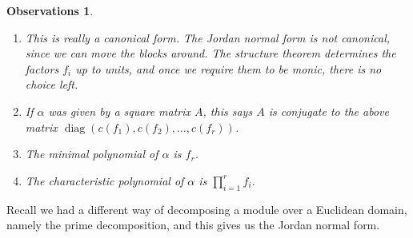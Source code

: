 \documentclass{article}
\theoremstyle{plain}\theoremheaderfont{\normalfont\itshape}\theorembodyfont{\rmfamily}\theoremseparator{.}\newtheorem*{rem}{Remark}\newtheorem*{ex}{Example}\newtheorem*{proof}{Proof}\newtheorem*{altp}{Alternative proof}\newtheorem*{nonex}{Non-Example}
\theoremstyle{plain}\theoremheaderfont{\normalfont\bfseries}\theorembodyfont{\rmfamily}\theoremseparator{.}\newtheorem{thm}{Theorem}[section]\newtheorem{lem}[thm]{Lemma}\newtheorem{prop}[thm]{Proposition}\newtheorem*{cor}{Corollary}\newtheorem{defn}[thm]{Definition}\newtheorem{clm}[thm]{Claim}\newtheorem{clminproof}{Claim}\newtheorem*{notn}{Notation}\newtheorem*{exer}{Exercise}\newtheorem*{lemnn}{Lemma}
\theoremstyle{break}\theoremheaderfont{\normalfont\itshape}\theorembodyfont{\rmfamily}\theoremseparator{.\medskip}\newtheorem*{proofskip}{Proof}\newtheorem*{exs}{Examples}\newtheorem*{rems}{Remarks}\newtheorem*{obs}{Observations}
\theoremstyle{break}\theoremheaderfont{\normalfont\bfseries}\theorembodyfont{\rmfamily}\theoremseparator{.\medskip}\newtheorem{lemskip}[thm]{Lemma}\newtheorem{defnskip}[thm]{Definition}\newtheorem{propskip}[thm]{Proposition}\newtheorem{thmskip}[thm]{Theorem}
\numberwithin{equation}{section}
\DeclareMathOperator{\diag}{diag}
\begin{document}
    \begin{obs}
        \begin{enumerate}[topsep=0pt,label=(\roman*)]
            \item This is really a canonical form. The Jordan normal form is not canonical, since we can move the blocks around. The structure theorem determines the factors \(f_i\) up to units, and once we require them to be monic, there is no choice left.
            \item If \(\alpha\) was given by a square matrix \(A\), this says \(A\) is conjugate to the above matrix \(\diag(c(f_1),c(f_2),\dots,c(f_r))\).
            \item The minimal polynomial of \(\alpha\) is \(f_r\).
            \item The characteristic polynomial of \(\alpha\) is \(\prod_{i=1}^{r}f_i\).
        \end{enumerate}
    \end{obs}
    Recall we had a different way of decomposing a module over a Euclidean domain, namely the prime decomposition, and this gives us the Jordan normal form.
    
\end{document}
